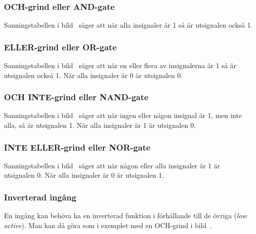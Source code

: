 \subsubsection{OCH-grind eller AND-gate}

Sanningstabellen i bild~ säger att när alla insignaler
är 1 så är utsignalen också 1.

\subsubsection{ELLER-grind eller OR-gate}


Sanningstabellen i bild~ säger att när en eller flera av
insignalerna är 1 så är utsignalen också 1.
När alla insignaler är 0 är utsignalen 0.

\subsubsection{OCH INTE-grind eller NAND-gate}

Sanningstabellen i bild~ säger att när ingen eller någon
insignal är 1, men inte alla, så är utsignalen 1.
När alla insignaler är 1 är utsignalen 0.

\subsubsection{INTE ELLER-grind eller NOR-gate}

Sanningstabellen i bild~ säger att när någon eller alla
insignaler är 1 är utsignalen 0.
När alla insignaler är 0 är utsignalen 1.

\subsubsection{Inverterad ingång}

En ingång kan behöva ha en inverterad funktion i förhållande till de övriga
(\emph{low active}).
Man kan då göra som i exemplet med en OCH-grind i bild~.




